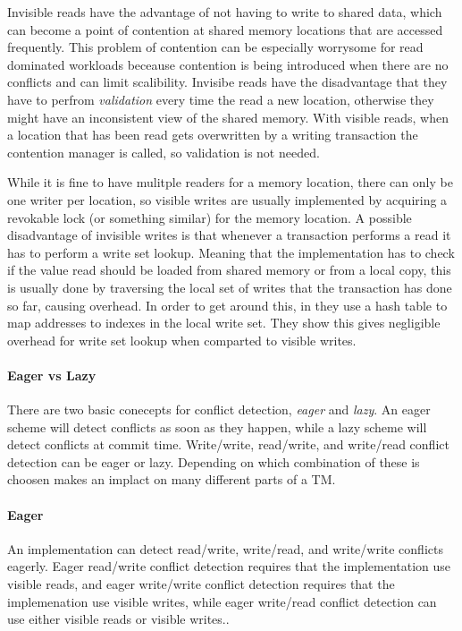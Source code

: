 Invisible reads have the advantage of not having to write to shared data, 
which can become a point of contention at shared memory locations that are accessed frequently.
This problem of contention can be especially worrysome for read dominated 
workloads beceause contention is being introduced when there are no conflicts and can limit scalibility.
Invisibe reads have the disadvantage that they have to perfrom \emph{validation}
 every time the read a new location, otherwise they might have an inconsistent view of the shared memory.
With visible reads, when a location that has been read gets overwritten
 by a writing transaction the contention manager is called, so validation is not needed.

While it is fine to have mulitple readers for a memory location,
 there can only be one writer per location, so visible writes are 
usually implemented by acquiring a revokable lock (or something similar) for the memory location.
A possible disadvantage of invisible writes is that whenever a transaction
 performs a read it has to perform a write set lookup.
Meaning that the implementation has to check if the value read should be 
loaded from shared memory or from a local copy, this is usually done by 
traversing the local set of writes that the transaction has done so far, causing overhead.
In order to get around this, in \cite{1504199} they use a hash table to 
map addresses to indexes in the local write set.
They show this gives negligible overhead for write set lookup when comparted to visible writes.

\paragraph{Eager vs Lazy}
There are two basic conecepts for conflict detection, \emph{eager} and \emph{lazy}.
  An eager scheme will detect conflicts as soon as they happen, while a lazy scheme will detect conflicts at commit time.
Write/write, read/write, and write/read conflict detection can be eager or lazy.
  Depending on which combination of these is choosen makes an implact on many different parts of a TM.

\paragraph{Eager}
An implementation can detect read/write, write/read, and write/write conflicts eagerly.
Eager read/write conflict detection requires that the implementation use 
visible reads, and eager write/write conflict detection requires that the implemenation 
use visible writes, while eager write/read conflict detection can use either visible reads or visible writes..

